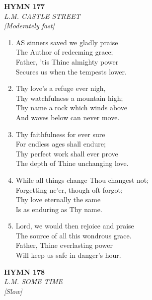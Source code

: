 \documentclass[11pt,a4paper]{article}
\begin{document}
\newpage
\begin{center}
    {\Large \textbf{HYMN 177}}
    \\
    \textit{L.M. CASTLE STREET}
    \\
    \textit{\small [Moderately fast]}
\end{center}
\vspace{1em}

\begin{enumerate}
    \item AS sinners saved we gladly praise \\
        The Author of redeeming grace; \\
        Father, 'tis Thine almighty power \\
        Secures us when the tempests lower.

    \item Thy love's a refuge ever nigh, \\
        Thy watchfulness a mountain high; \\
        Thy name a rock which winds above \\
        And waves below can never move.

    \item Thy faithfulness for ever sure \\
        For endless ages shall endure; \\
        Thy perfect work shall ever prove \\
        The depth of Thine unchanging love.

    \item While all things change Thou changest not; \\
        Forgetting ne'er, though oft forgot; \\
        Thy love eternally the same \\
        Is as enduring as Thy name.

    \item Lord, we would then rejoice and praise \\
        The source of all this wondrous grace. \\
        Father, Thine everlasting power \\
        Will keep us safe in danger's hour.

\end{enumerate}

\newpage
\begin{center}
    {\Large \textbf{HYMN 178}}
    \\
    \textit{L.M. SOME TIME}
    \\
    \textit{\small [Slow]}
\end{center}
\vspace{1em}
\end{document}
